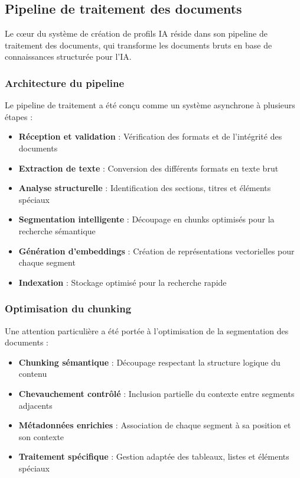 \subsection{Pipeline de traitement des documents}

Le cœur du système de création de profils IA réside dans son pipeline de traitement des documents, qui transforme les documents bruts en base de connaissances structurée pour l'IA.

\subsubsection{Architecture du pipeline}

Le pipeline de traitement a été conçu comme un système asynchrone à plusieurs étapes :

\begin{itemize}
  \item \textbf{Réception et validation} : Vérification des formats et de l'intégrité des documents
  
  \item \textbf{Extraction de texte} : Conversion des différents formats en texte brut
  
  \item \textbf{Analyse structurelle} : Identification des sections, titres et éléments spéciaux
  
  \item \textbf{Segmentation intelligente} : Découpage en chunks optimisés pour la recherche sémantique
  
  \item \textbf{Génération d'embeddings} : Création de représentations vectorielles pour chaque segment
  
  \item \textbf{Indexation} : Stockage optimisé pour la recherche rapide
\end{itemize}

\subsubsection{Optimisation du chunking}

Une attention particulière a été portée à l'optimisation de la segmentation des documents :

\begin{itemize}
  \item \textbf{Chunking sémantique} : Découpage respectant la structure logique du contenu
  
  \item \textbf{Chevauchement contrôlé} : Inclusion partielle du contexte entre segments adjacents
  
  \item \textbf{Métadonnées enrichies} : Association de chaque segment à sa position et son contexte
  
  \item \textbf{Traitement spécifique} : Gestion adaptée des tableaux, listes et éléments spéciaux
\end{itemize}


